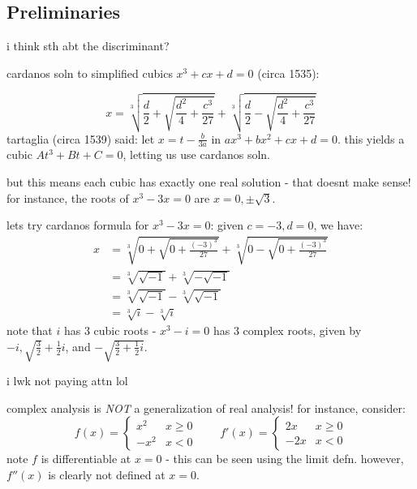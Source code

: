 \subsection{Preliminaries}

i think sth abt the discriminant?

cardanos soln to simplified cubics $x^{3}+cx+d=0$ (circa 1535):

\begin{equation*}
    x=\sqrt[3]{\frac{d}{2}+\sqrt{\frac{d^{2}}{4}+\frac{c^{3}}{27}}}
    + \sqrt[3]{\frac{d}{2}-\sqrt{\frac{d^{2}}{4}+\frac{c^{3}}{27}}}
\end{equation*}
tartaglia (circa 1539) said: let $x=t-\frac{b}{3a}$ in $ax^{3}+bx^{2}+cx+d=0$.
this yields a cubic $At^{3}+Bt+C=0$, letting us use cardanos soln.

but this means each cubic has exactly one real solution - that doesnt make sense!
for instance, the roots of $x^{3}-3x=0$ are $x=0,\pm\sqrt{3}$.

lets try cardanos formula for $x^{3}-3x=0$:
given $c=-3,d=0$, we have:
\begin{align*}
    x &= \sqrt[3]{0+\sqrt{0+\frac{(-3)^{3}}{27}}}
    +\sqrt[3]{0-\sqrt{0+\frac{(-3)^{3}}{27}}} \\
      &= \sqrt[3]{\sqrt{-1}}+\sqrt[3]{-\sqrt{-1}} \\
      &= \sqrt[3]{\sqrt{-1}} - \sqrt[3]{\sqrt{-1}} \\
      &= \sqrt[3]{i} - \sqrt[3]{i}
\end{align*}
note that $i$ has 3 cubic roots - $x^{3}-i=0$ has 3 complex roots, given
by $-i, \sqrt{\frac{3}{2}}+\frac{1}{2}i$, and $-\sqrt{\frac{3}{2}+\frac{1}{2}i}$.

i lwk not paying attn lol

complex analysis is \textit{NOT} a generalization of real analysis!
for instance, consider:
\begin{equation*}
    f(x)=
    \begin{cases}
        x^{2} & x\geq0 \\ -x^{2} & x<0
    \end{cases} \qquad
    f'(x)=
    \begin{cases}
        2x & x\geq0 \\ -2x & x<0
    \end{cases}
\end{equation*}
note $f$ is differentiable at $x=0$ - this can be seen using the limit defn.
however, $f''(x)$ is clearly not defined at $x=0$.

